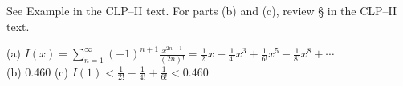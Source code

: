 \begin{hint}
See Example  in the
CLP--II text.
For parts (b) and (c), review  \S {} in the
CLP--II text.

\end{hint}

\begin{answer}
(a)
 $\displaystyle I(x)=\sum_{n=1}^\infty (-1)^{n+1}\frac{x^{2n-1}}{(2n)!}= \frac{1}{2!}x-\frac{1}{4!}x^3+\frac{1}{6!}x^5-\frac{1}{8!}x^8+\cdots$
\\ (b)
 0.460
\qquad (c)
 $\displaystyle I(1)<\frac{1}{2!}-\frac{1}{4!}+\frac{1}{6!}<0.460$

\end{answer}

